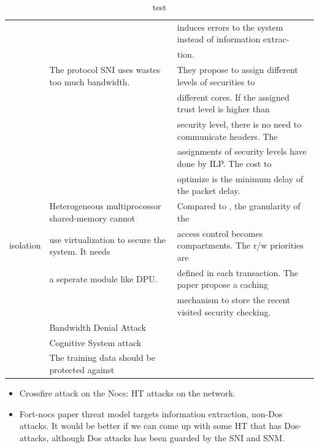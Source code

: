 \documentclass[]{article}
\begin{document}
\begin{table}[!t]
\begin{tabular}{c l l}
							&													& induces errors to the system instead of information extrac-\\
							&													& tion.\\
	\hline
	~\cite{hu2015automatic} & The protocol SNI uses wastes too much bandwidth.  & They propose to assign different levels of securities to 	\\
							&													& different cores. If the assigned trust level is higher than\\
							&													& security level, there is no need to communicate headers. The \\
							&													& assignments of security levels have done by ILP. The cost to\\
							&													& optimize is the minimum delay of the packet delay. \\
	\hline
	~\cite{porquet2011noc}	& Heterogeneous multiprocessor shared-memory cannot & Compared to \cite{fiorin2008secure}, the granularity of the\\
	isolation				& use virtualization to secure the system. It needs	& access control becomes compartments. The r/w priorities are \\
							& a seperate module like DPU.						& defined in each transaction. The paper propose a caching \\
							&													& mechanism to store the recent visited security checking.\\
	\hline
	~\cite{js2015runtime}	& Bandwidth Denial Attack							& \\
	\hline
	~\cite{liu2015cloning}	& Cognitive System attack							& \\
							& The training data should be protected against 	& \\
							


	\end{tabular}
	\caption{test}
\end{table}

\begin{itemize}
	\item Crossfire attack on the Nocs: HT attacks on the network.
	\item Fort-nocs paper threat model targets information extraction, non-Dos attacks. It would be better if we can come up with some HT that
			has Dos-attacks, although Dos attacks has been guarded by the SNI and SNM.
\end{itemize}
\end{document}
